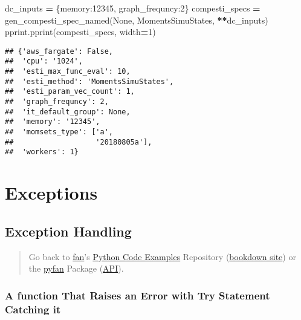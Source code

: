 \documentclass[
]{book}
\newenvironment{Shaded}{\begin{snugshade}}{\end{snugshade}}
\newcommand{\DecValTok}[1]{\textcolor[rgb]{0.00,0.00,0.81}{#1}}
\newcommand{\NormalTok}[1]{#1}
\newcommand{\OperatorTok}[1]{\textcolor[rgb]{0.81,0.36,0.00}{\textbf{#1}}}
\newcommand{\StringTok}[1]{\textcolor[rgb]{0.31,0.60,0.02}{#1}}
\newcommand{\VariableTok}[1]{\textcolor[rgb]{0.00,0.00,0.00}{#1}}
\begin{document}
\begin{Shaded}
\begin{Highlighting}[]
\NormalTok{dc\_inputs }\OperatorTok{=}\NormalTok{ \{}\StringTok{\textquotesingle{}memory\textquotesingle{}}\NormalTok{:}\DecValTok{12345}\NormalTok{, }\StringTok{\textquotesingle{}graph\_frequncy\textquotesingle{}}\NormalTok{:}\DecValTok{2}\NormalTok{\}}
\NormalTok{compesti\_specs }\OperatorTok{=}\NormalTok{ gen\_compesti\_spec\_named(}\VariableTok{None}\NormalTok{, }\StringTok{\textquotesingle{}MomentsSimuStates\textquotesingle{}}\NormalTok{, }\OperatorTok{**}\NormalTok{dc\_inputs)}
\NormalTok{pprint.pprint(compesti\_specs, width}\OperatorTok{=}\DecValTok{1}\NormalTok{)}
\end{Highlighting}
\end{Shaded}

\begin{verbatim}
## {'aws_fargate': False,
##  'cpu': '1024',
##  'esti_max_func_eval': 10,
##  'esti_method': 'MomentsSimuStates',
##  'esti_param_vec_count': 1,
##  'graph_frequncy': 2,
##  'it_default_group': None,
##  'memory': '12345',
##  'momsets_type': ['a',
##                   '20180805a'],
##  'workers': 1}
\end{verbatim}

\hypertarget{exceptions}{%
\section{Exceptions}\label{exceptions}}

\hypertarget{exception-handling}{%
\subsection{Exception Handling}\label{exception-handling}}

\begin{quote}
Go back to \href{http://fanwangecon.github.io/}{fan}'s \href{https://fanwangecon.github.io/Py4Econ/}{Python Code Examples} Repository (\href{https://fanwangecon.github.io/Py4Econ/bookdown}{bookdown site}) or the \href{https://pyfan.readthedocs.io/en/latest/}{pyfan} Package (\href{https://pyfan.readthedocs.io/en/latest/reference.html}{API}).
\end{quote}

\hypertarget{a-function-that-raises-an-error-with-try-statement-catching-it}{%
\subsubsection{A function That Raises an Error with Try Statement Catching it}\label{a-function-that-raises-an-error-with-try-statement-catching-it}}
\end{document}

